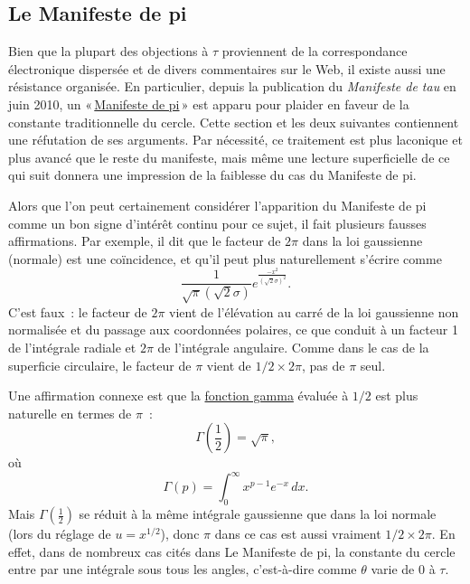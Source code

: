 
  \subsection{Le Manifeste de pi} %
  \label{sec:the_pi_manifesto_a_rebuttal}

Bien que la plupart des objections à $\tau$ proviennent de la correspondance électronique dispersée et de divers commentaires sur le Web, il existe aussi une résistance organisée. En particulier, depuis la publication du \emph{Manifeste de tau} en juin 2010, un «\,\href{http://thepimanifesto.com/}{Manifeste de pi}\,» est apparu pour plaider en faveur de la constante traditionnelle du cercle. Cette section et les deux suivantes contiennent une réfutation de ses arguments. Par nécessité, ce traitement est plus laconique et plus avancé que le reste du manifeste, mais même une lecture superficielle de ce qui suit donnera une impression de la faiblesse du cas du Manifeste de pi.

Alors que l'on peut certainement considérer l'apparition du Manifeste de pi comme un bon signe d'intérêt continu pour ce sujet, il fait plusieurs fausses affirmations. Par exemple, il dit que le facteur de $2\pi$ dans la loi gaussienne (normale) est une coïncidence, et qu'il peut plus naturellement s'écrire comme
\[
\frac{1}{\sqrt\pi(\sqrt 2\sigma)}e^{\frac{-x^2}{(\sqrt 2\sigma)^2}}.
\]
C'est faux~: le facteur de $2\pi$ vient de l'élévation au carré de la loi gaussienne non normalisée et du passage aux coordonnées polaires, ce que conduit à un facteur 1 de 
l'intégrale radiale et $2\pi$ de l'intégrale angulaire. Comme dans le cas de la superficie circulaire, le facteur
de $\pi$ vient de $1/2\times 2\pi$, pas de $\pi$ seul.

Une affirmation connexe est que la \href{https://fr.wikipedia.org/wiki/Fonction_gamma}{fonction gamma} évaluée à $1/2$ est plus naturelle en termes de $\pi$~:
\[
\Gamma(\textstyle{\frac{1}{2}}) = \sqrt{\pi},
\]
où
\begin{equation}
\label{eq:gamma}
\Gamma(p) = \int_{0}^{\infty} x^{p-1} e^{-x}\,dx.
\end{equation}
Mais $\Gamma(\frac{1}{2})$ se réduit à la même intégrale gaussienne que dans la loi normale (lors du réglage de $u =
x^{1/2}$), donc $\pi$ dans ce cas est aussi vraiment $1/2\times 2\pi$. En effet, dans de nombreux cas cités dans Le Manifeste de pi,
la constante du cercle entre par une intégrale sous tous les angles, c'est-à-dire
comme $\theta$ varie de $0$ à $\tau$.

